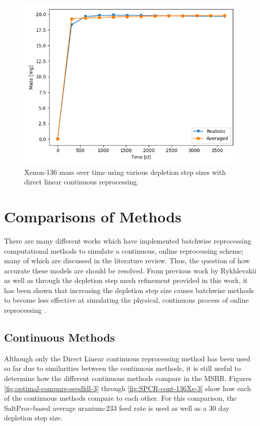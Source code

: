 \begin{figure}[H]
  \centering
  \includegraphics[scale=0.5]{images/adv-Xe136.png}
  \caption{Xenon-136 mass over time using various depletion step sizes with direct linear continuous reprocessing.}
   \label{fig:DL-cont-xe136-adv}
\end{figure}

\section{Comparisons of Methods}

There are many different works which have implemented batchwise reprocessing computational methods to simulate a continuous, online reprocessing scheme; many of which are discussed in the literature review. Thus, the question of how accurate these models are should be resolved. From previous work by Rykhlevskii as well as through the depletion step mesh refinement provided in this work, it has been shown that increasing the depletion step size causes batchwise methods to become less effective at simulating the physical, continuous process of online reprocessing \cite{rykhlevskii_fuel_2020}.

\subsection{Continuous Methods}

Although only the Direct Linear continuous reprocessing method has been used so far due to similarities between the continuous methods, it is still useful to determine how the different continuous methods compare in the MSBR.  Figures \ref{fig:optimal-compare-sspdldl-3} through \ref{fig:SPCR-cont-136Xe-3} show how each of the continuous methods compare to each other. For this comparison, the SaltProc-based average uranium-233 feed rate is used as well as a 30 day depletion step size.

